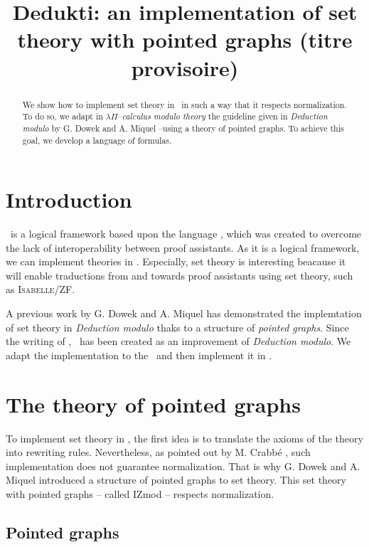 \documentclass[a4paper]{article}
\title{\textbf{Dedukti: an implementation of set theory with pointed graphs} (titre provisoire)}
\date{}
\begin{document}
\thispagestyle{empty}
\maketitle

\begin{abstract}
We show how to implement set theory in \dedukti ~in such a way that it respects normalization. To do so, we adapt in $\lambda \Pi$\textit{--calculus modulo theory} the guideline given in \textit{Deduction modulo} by G. Dowek and A. Miquel --using a theory of pointed graphs. To achieve this goal, we develop a language of formulas.
\end{abstract}

\section{Introduction}

\dedukti \ is a logical framework based upon the language \lpcm, which was created to overcome the lack of interoperability between proof assistants. As it is a logical framework, we can implement theories in \dedukti. Especially, set theory is interesting beacause it will enable traductions from and towards proof assistants using set theory, such as \textsc{Isabelle/ZF}.

A previous work by G. Dowek and A. Miquel \cite{zermodulo} has demonstrated the implemtation of set theory in \textit{Deduction modulo} thaks to a structure of \textit{pointed graphs}. Since the writing of \cite{zermodulo}, \lpcm \ has been created as an improvement of \textit{Deduction modulo}. We adapt the implementation to the \lpcm \ and then implement it in \dedukti. 

\section{The theory of pointed graphs}

To implement set theory in \dedukti, the first idea is to translate the axioms of the theory into rewriting rules. Nevertheless, as pointed out by M. Crabbé \cite{crabbé}, such implementation does not guarantee normalization. That is why G. Dowek and A. Miquel \cite{zermodulo} introduced a structure of pointed graphs to set theory. This set theory with pointed graphs -- called IZmod -- respects normalization.

\subsection{Pointed graphs}
\end{document}
